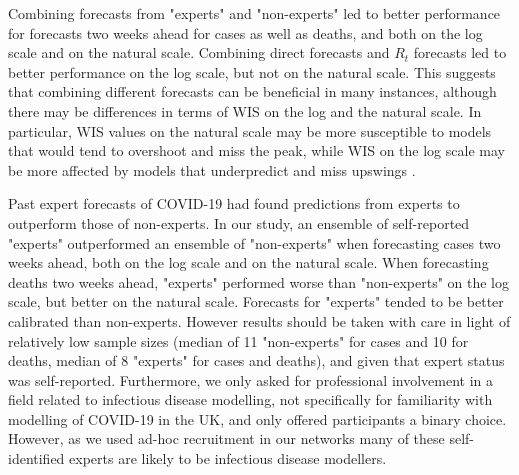 \documentclass[10pt,a4paper,twocolumn]{article}
\begin{document}
Combining forecasts from "experts" and "non-experts" led to better performance for forecasts two weeks ahead for cases as well as deaths, and both on the log scale and on the natural scale. Combining direct forecasts and $R_t$ forecasts led to better performance on the log scale, but not on the natural scale. This suggests that combining different forecasts can be beneficial in many instances, although there may be differences in terms of WIS on the log and the natural scale. In particular, WIS values on the natural scale may be more susceptible to models that would tend to overshoot and miss the peak, while WIS on the log scale may be more affected by models that underpredict and miss upswings \citep{bosseTransformationForecastsEvaluating2023}. 


Past expert forecasts of COVID-19 \cite{recchiaHowWellDid2021} had found predictions from experts to outperform those of non-experts. In our study, an ensemble of self-reported "experts" outperformed an ensemble of "non-experts" when forecasting cases two weeks ahead, both on the log scale and on the natural scale. When forecasting deaths two weeks ahead, "experts" performed worse than "non-experts" on the log scale, but better on the natural scale. Forecasts for "experts" tended to be better calibrated than non-experts.  However results should be taken with care in light of relatively low sample sizes (median of 11 "non-experts" for cases and 10 for deaths, median of 8 "experts" for cases and deaths), and given that expert status was self-reported. Furthermore, we only asked for professional involvement in a field related to infectious disease modelling, not specifically for familiarity with modelling of COVID-19 in the UK, and only offered participants a binary choice. However, as we used ad-hoc recruitment in our networks many of these self-identified experts are likely to be infectious disease modellers.
\end{document}
